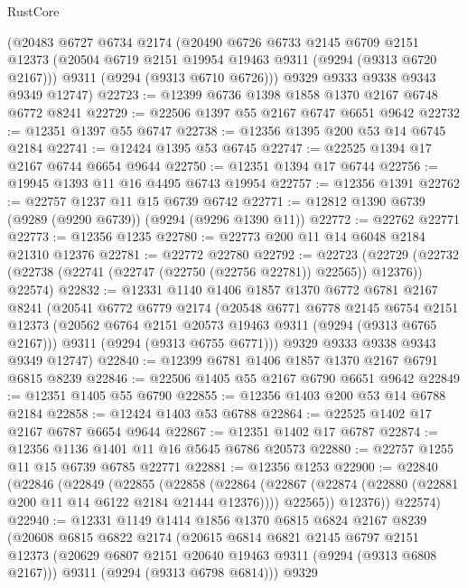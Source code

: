 \begin{lexlean}{RustCore}
\begin{coremodule}
    (@20483
      @6727
      @6734
      @2174
      (@20490
        @6726
        @6733
        @2145
        @6709
        @2151
        @12373
        (@20504 @6719 @2151 @19954 @19463 @9311 (@9294 (@9313 @6720 @2167)))
        @9311
        (@9294 (@9313 @6710 @6726)))
      @9329
      @9333
      @9338
      @9343
      @9349
      @12747)
@22723 := @12399 @6736 @1398 @1858 @1370 @2167 @6748 @6772 @8241
@22729 := @22506 @1397 @55 @2167 @6747 @6651 @9642
@22732 := @12351 @1397 @55 @6747
@22738 := @12356 @1395 @200 @53 @14 @6745 @2184
@22741 := @12424 @1395 @53 @6745
@22747 := @22525 @1394 @17 @2167 @6744 @6654 @9644
@22750 := @12351 @1394 @17 @6744
@22756 := @19945 @1393 @11 @16 @4495 @6743 @19954
@22757 := @12356 @1391
@22762 := @22757 @1237 @11 @15 @6739 @6742
@22771 := @12812 @1390 @6739 (@9289 (@9290 @6739)) (@9294 (@9296 @1390 @11))
@22772 := @22762 @22771
@22773 := @12356 @1235
@22780 := @22773 @200 @11 @14 @6048 @2184 @21310 @12376
@22781 := @22772 @22780
@22792 := @22723
    (@22729 (@22732 (@22738 (@22741 (@22747 (@22750 (@22756 @22781)) @22565)) @12376)) @22574)
@22832 := @12331
    @1140
    @1406
    @1857
    @1370
    @6772
    @6781
    @2167
    @8241
    (@20541
      @6772
      @6779
      @2174
      (@20548
        @6771
        @6778
        @2145
        @6754
        @2151
        @12373
        (@20562 @6764 @2151 @20573 @19463 @9311 (@9294 (@9313 @6765 @2167)))
        @9311
        (@9294 (@9313 @6755 @6771)))
      @9329
      @9333
      @9338
      @9343
      @9349
      @12747)
@22840 := @12399 @6781 @1406 @1857 @1370 @2167 @6791 @6815 @8239
@22846 := @22506 @1405 @55 @2167 @6790 @6651 @9642
@22849 := @12351 @1405 @55 @6790
@22855 := @12356 @1403 @200 @53 @14 @6788 @2184
@22858 := @12424 @1403 @53 @6788
@22864 := @22525 @1402 @17 @2167 @6787 @6654 @9644
@22867 := @12351 @1402 @17 @6787
@22874 := @12356 @1136 @1401 @11 @16 @5645 @6786 @20573
@22880 := @22757 @1255 @11 @15 @6739 @6785 @22771
@22881 := @12356 @1253
@22900 := @22840
    (@22846
      (@22849
        (@22855
          (@22858
            (@22864
              (@22867 (@22874 (@22880 (@22881 @200 @11 @14 @6122 @2184 @21444 @12376))))
              @22565))
          @12376))
      @22574)
@22940 := @12331
    @1149
    @1414
    @1856
    @1370
    @6815
    @6824
    @2167
    @8239
    (@20608
      @6815
      @6822
      @2174
      (@20615
        @6814
        @6821
        @2145
        @6797
        @2151
        @12373
        (@20629 @6807 @2151 @20640 @19463 @9311 (@9294 (@9313 @6808 @2167)))
        @9311
        (@9294 (@9313 @6798 @6814)))
      @9329

\end{coremodule}
\end{lexlean}

